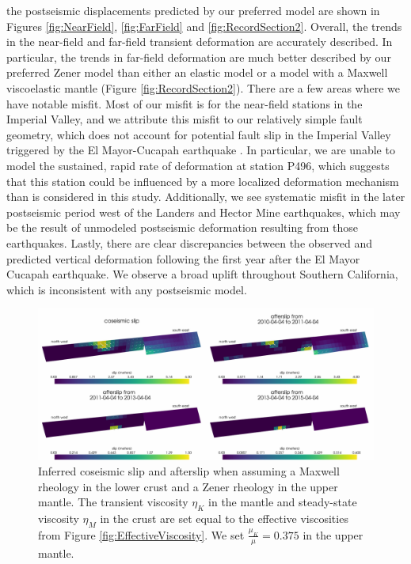 \documentclass[draft,linenumbers]{AGUJournal}
\begin{document}
the postseismic displacements predicted by our preferred model are shown in Figures \ref{fig:NearField}, \ref{fig:FarField} and \ref{fig:RecordSection2}.  Overall, the trends in the near-field and far-field transient deformation are accurately described.  In particular, the trends in far-field deformation are much better described by our preferred Zener model than either an elastic model or a model with a Maxwell viscoelastic mantle (Figure \ref{fig:RecordSection2}).  There are a few areas where we have notable misfit.  Most of our misfit is for the near-field stations in the Imperial Valley, and we attribute this misfit to our relatively simple fault geometry, which does not account for potential fault slip in the Imperial Valley triggered by the El Mayor-Cucapah earthquake \citep{Wei2011a,Wei2015}. In particular, we are unable to model the sustained, rapid rate of deformation at station P496, which suggests that this station could be influenced by a more localized deformation mechanism than is considered in this study.  Additionally, we see systematic misfit in the later postseismic period west of the Landers and Hector Mine earthquakes, which may be the result of unmodeled postseismic deformation resulting from those earthquakes.  Lastly, there are clear discrepancies between the observed and predicted vertical deformation following the first year after the El Mayor Cucapah earthquake. We observe a broad uplift throughout Southern California, which is inconsistent with any postseismic model.

\begin{figure}
\includegraphics[scale=0.8]{Figures/FinalSlip}
\centering 
\caption{Inferred coseismic slip and afterslip when assuming a Maxwell rheology in the lower crust and a Zener rheology in the upper mantle.  The transient viscosity $\eta_K$ in the mantle and steady-state viscosity $\eta_M$ in the crust are set equal to the effective viscosities from Figure \ref{fig:EffectiveViscosity}. We set $\frac{\mu_K}{\mu}=0.375$ in the upper mantle.}
\label{fig:FinalSlip}
\end{figure}
  
\end{document}

